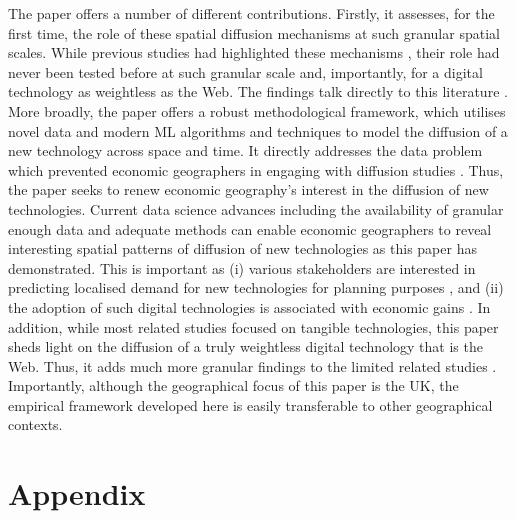 \documentclass[
  authoryear,
  preprint,
  3p]{elsarticle}
\begin{document}
The paper offers a number of different contributions. Firstly, it
assesses, for the first time, the role of these spatial diffusion
mechanisms at such granular spatial scales. While previous studies had
highlighted these mechanisms
\citep{hagerstrand1968innovation, rogers2010diffusion, grubler1990rise},
their role had never been tested before at such granular scale and,
importantly, for a digital technology as weightless as the Web. The
findings talk directly to this literature
\citep[e.g.][]{beardsell1999spatial, haller2011determinants, lengyel2020role}.
More broadly, the paper offers a robust methodological framework, which
utilises novel data and modern ML algorithms and techniques to model the
diffusion of a new technology across space and time. It directly
addresses the data problem which prevented economic geographers in
engaging with diffusion studies
\citep{iso2005, kemeny2011international, zook2022mapping}. Thus, the
paper seeks to renew economic geography's interest in the diffusion of
new technologies. Current data science advances including the
availability of granular enough data and adequate methods can enable
economic geographers to reveal interesting spatial patterns of diffusion
of new technologies as this paper has demonstrated. This is important as
(i) various stakeholders are interested in predicting localised demand
for new technologies for planning purposes
\citep{leibowicz2016representing, meade2021modelling}, and (ii) the
adoption of such digital technologies is associated with economic gains
\citep{solow1957technical, aghion1990model, kemeny2011international, tranosuk, capello2024nexus}.
In addition, while most related studies focused on tangible
technologies, this paper sheds light on the diffusion of a truly
weightless digital technology that is the Web. Thus, it adds much more
granular findings to the limited related studies
\citep{sinai2004geography, haller2011determinants}. Importantly,
although the geographical focus of this paper is the UK, the empirical
framework developed here is easily transferable to other geographical
contexts.

\setcounter{section}{0}
\renewcommand{\thesection}{\Alph{section}}
\setcounter{table}{0}
\renewcommand{\thetable}{A\arabic{table}}
\setcounter{figure}{0}
\renewcommand{\thefigure}{A\arabic{figure}}

\section{Appendix}\label{appendix}
\end{document}
